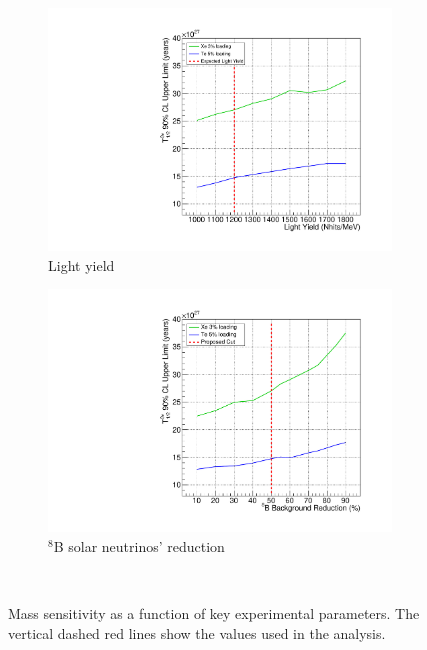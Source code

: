 \begin{figure}[H]
\centering
\begin{subfigure}[b]{0.35\textwidth}
 \includegraphics[width=\textwidth]{dbd/ly_fc.pdf}
 \caption{Light yield}
 \label{fig:scale-ly}
\end{subfigure}
\begin{subfigure}[b]{0.35\textwidth}
 \includegraphics[width=\textwidth]{dbd/b8_reduction_fc.pdf}
 \caption{$^8$B solar neutrinos' reduction}
 \label{fig:scale-b8}
\end{subfigure}\\
\caption{Mass sensitivity as a function of key experimental parameters. The vertical dashed red lines show the values used in the analysis.}
\label{fig:scaling-plots}
\end{figure}

